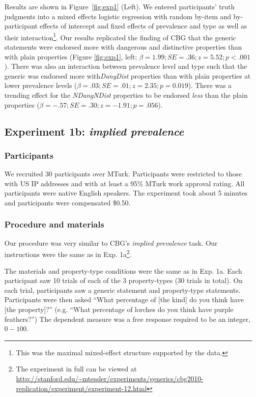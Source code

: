 \documentclass[10pt,letterpaper]{article}
\begin{document}
Results are shown in Figure~\ref{fig:exp1} (Left). We entered participants' truth judgments into a mixed effects logistic regression with random by-item and by-participant effects of intercept and fixed effects of prevalence and type as well as their interaction\footnote{This was the maximal mixed-effect structure supported by the data.}.  
%
Our results replicated the finding of CBG that the generic statements were endorsed more with dangerous and distinctive properties than with plain properties (Figure \ref{fig:exp1}, left; $\beta=1.99; SE = .36; z = 5.52; p < .001$). 
%
There was also an interaction between prevalence level and type such that the generic was endorsed more with\emph{DangDist} properties than with plain properties at lower prevalence levels ($\beta=.03; SE = .01; z=2.35; p = 0.019$). There was a trending effect for the \emph{NDangNDist} properties to be endorsed \emph{less} than the plain properties ($\beta=-.57; SE = .30; z=-1.91; p = .056$).

\subsection{Experiment 1b: \emph{implied prevalence}}

\subsubsection{Participants}

We recruited 30 participants over MTurk.  Participants were restricted to those with US IP addresses and with at least a 95\% MTurk work approval rating. All participants were native English speakers. The experiment took about 5 minutes and participants were compensated \$0.50.

\subsubsection{Procedure and materials}

Our procedure was very similar to CBG's \emph{implied prevalence} task. Our instructions were the same as in Exp. 1a\footnote{The experiment in full can be viewed at \url{http://stanford.edu/~mtessler/experiments/generics/cbg2010-replication/experiment/experiment-12.html}}. 

The materials and property-type conditions were the same as in Exp. 1a. Each participant saw 10 trials of each of the 3 property-types (30 trials in total). On each trial, participants saw a generic statement and property-type statements. 
Participants were then asked ``What percentage of [the kind] do you think have [the property]?'' (e.g. ``What percentage of lorches do you think have purple feathers?'') The dependent measure was a free response required to be an integer, $0-100$. 
\end{document}
